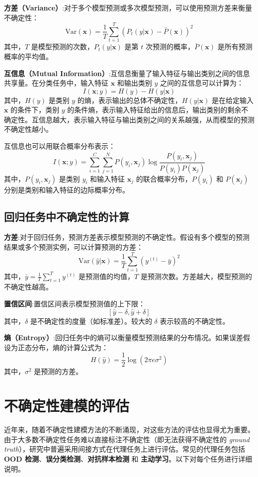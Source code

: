 \textbf{方差（Variance）}:对于多个模型预测或多次模型预测，可以使用预测方差来衡量不确定性：
\[
\text{Var}(\mathbf{x}) = \frac{1}{T} \sum_{t=1}^{T} \left( P_t(y | \mathbf{x}) - \bar{P}(\mathbf{x}) \right)^2
\]
其中，\( T \) 是模型预测的次数，\( P_t(y | \mathbf{x}) \) 是第 \( t \) 次预测的概率，\( \bar{P}(\mathbf{x}) \) 是所有预测概率的平均值。

\textbf{互信息（Mutual Information）}:互信息衡量了输入特征与输出类别之间的信息共享量。在分类任务中，输入特征 \( \mathbf{x} \) 和输出类别 \( y \) 之间的互信息可以计算为：
\[
I(\mathbf{x}; y) = H(y) - H(y | \mathbf{x})
\]
其中，\( H(y) \) 是类别 \( y \) 的熵，表示输出的总体不确定性，\( H(y | \mathbf{x}) \) 是在给定输入 \( \mathbf{x} \) 的条件下，类别 \( y \) 的条件熵，表示输入特征给出的信息后，输出类别的剩余不确定性。互信息越大，表示输入特征与输出类别之间的关系越强，从而模型的预测不确定性越小。

互信息也可以用联合概率分布表示：
\[
I(\mathbf{x}; y) = \sum_{i=1}^{C} \sum_{j=1}^{N} P(y_i, \mathbf{x}_j) \log \frac{P(y_i, \mathbf{x}_j)}{P(y_i) P(\mathbf{x}_j)}
\]
其中，\( P(y_i, \mathbf{x}_j) \) 是类别 \( y_i \) 和输入特征 \( \mathbf{x}_j \) 的联合概率分布，\( P(y_i) \) 和 \( P(\mathbf{x}_j) \) 分别是类别和输入特征的边际概率分布。



\subsection{回归任务中不确定性的计算}
\textbf{方差}:对于回归任务，预测方差表示模型预测的不确定性。假设有多个模型的预测结果或多个预测实例，可以计算预测的方差：
\[
\text{Var}(\hat{y} | \mathbf{x}) = \frac{1}{T} \sum_{t=1}^{T} \left( y^{(t)} - \bar{y} \right)^2
\]
其中，\( \bar{y} = \frac{1}{T} \sum_{t=1}^{T} y^{(t)} \) 是预测值的均值，\( T \) 是预测次数。方差越大，模型预测的不确定性越高。

\textbf{置信区间}:置信区间表示模型预测值的上下限：
\[
[\hat{y} - \delta, \hat{y} + \delta]
\]
其中，\( \delta \) 是不确定性的度量（如标准差）。较大的 \( \delta \) 表示较高的不确定性。

\textbf{熵（Entropy）}:回归任务中的熵可以衡量模型预测结果的分布情况。如果误差假设为正态分布，熵的计算公式为：
\[
H(\hat{y}) = \frac{1}{2} \log (2\pi e \sigma^2)
\]
其中，\( \sigma^2 \) 是预测的方差。


\section{不确定性建模的评估}
近年来，随着不确定性建模方法的不断涌现，对这些方法的评估也显得尤为重要。由于大多数不确定性任务难以直接标注不确定性（即无法获得不确定性的 \textit{ground truth}），研究中普遍采用间接方式在代理任务上进行评估。常见的代理任务包括 \textbf{OOD 检测}、\textbf{误分类检测}、\textbf{对抗样本检测} 和 \textbf{主动学习}。以下对每个任务进行详细说明。

